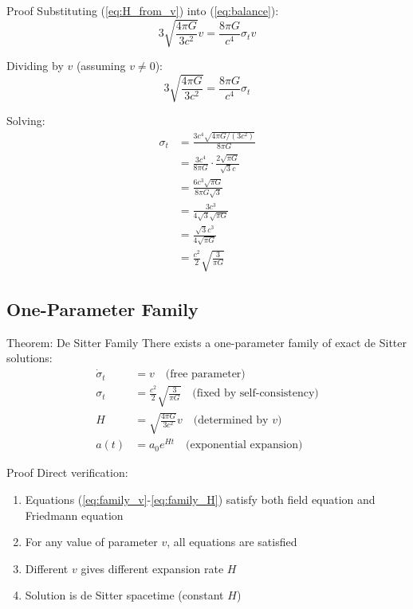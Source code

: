\documentclass[11pt,a4paper]{article}
\theoremstyle{definition}
\theoremstyle{remark}
\begin{document}
	Proof
		Substituting (\ref{eq:H_from_v}) into (\ref{eq:balance}):
		\begin{equation}
			3\sqrt{\frac{4\pi G}{3c^2}}v = \frac{8\pi G}{c^4}\sigma_t v
		\end{equation}
		
		Dividing by $v$ (assuming $v \neq 0$):
		\begin{equation}
			3\sqrt{\frac{4\pi G}{3c^2}} = \frac{8\pi G}{c^4}\sigma_t
		\end{equation}
		
		Solving:
		\begin{align}
			\sigma_t &= \frac{3c^4\sqrt{4\pi G/(3c^2)}}{8\pi G}\\
			&= \frac{3c^4}{8\pi G}\cdot\frac{2\sqrt{\pi G}}{\sqrt{3}c}\\
			&= \frac{6c^3\sqrt{\pi G}}{8\pi G\sqrt{3}}\\
			&= \frac{3c^3}{4\sqrt{3}\sqrt{\pi G}}\\
			&= \frac{\sqrt{3}c^3}{4\sqrt{\pi G}}\\
			&= \frac{c^2}{2}\sqrt{\frac{3}{\pi G}}
		\end{align}
	
	\subsection{One-Parameter Family}
	
	Theorem: De Sitter Family
		There exists a one-parameter family of exact de Sitter solutions:
		\begin{align}
			\dot{\sigma}_t &= v \quad \text{(free parameter)}\label{eq:family_v}\\
			\sigma_t &= \frac{c^2}{2}\sqrt{\frac{3}{\pi G}} \quad \text{(fixed by self-consistency)}\label{eq:family_sigma}\\
			H &= \sqrt{\frac{4\pi G}{3c^2}}v \quad \text{(determined by } v)\label{eq:family_H}\\
			a(t) &= a_0 e^{Ht} \quad \text{(exponential expansion)}
		\end{align}
	
	Proof
		Direct verification:
		\begin{enumerate}
			\item Equations (\ref{eq:family_v}-\ref{eq:family_H}) satisfy both field equation and Friedmann equation
			\item For any value of parameter $v$, all equations are satisfied
			\item Different $v$ gives different expansion rate $H$
			\item Solution is de Sitter spacetime (constant $H$)
		\end{enumerate}
	
\end{document}

